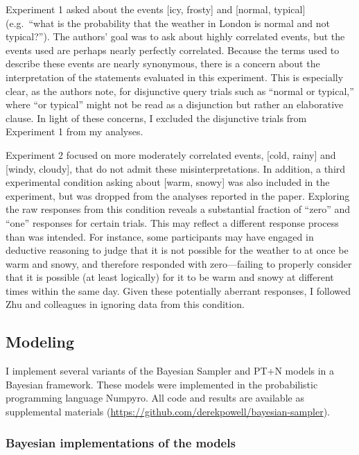 \documentclass[
  english,
  man,floatsintext]{apa6}
\begin{document}
Experiment 1 asked about the events {[}icy, frosty{]} and {[}normal, typical{]} (e.g.~``what is the probability that the weather in London is normal and not typical?''). The authors' goal was to ask about highly correlated events, but the events used are perhaps nearly perfectly correlated. Because the terms used to describe these events are nearly synonymous, there is a concern about the interpretation of the statements evaluated in this experiment. This is especially clear, as the authors note, for disjunctive query trials such as ``normal or typical,'' where ``or typical'' might not be read as a disjunction but rather an elaborative clause. In light of these concerns, I excluded the disjunctive trials from Experiment 1 from my analyses.

Experiment 2 focused on more moderately correlated events, {[}cold, rainy{]} and {[}windy, cloudy{]}, that do not admit these misinterpretations. In addition, a third experimental condition asking about {[}warm, snowy{]} was also included in the experiment, but was dropped from the analyses reported in the paper. Exploring the raw responses from this condition reveals a substantial fraction of ``zero'' and ``one'' responses for certain trials. This may reflect a different response process than was intended. For instance, some participants may have engaged in deductive reasoning to judge that it is not possible for the weather to at once be warm and snowy, and therefore responded with zero---failing to properly consider that it is possible (at least logically) for it to be warm and snowy at different times within the same day. Given these potentially aberrant responses, I followed Zhu and colleagues \autocite*{zhu.etal2020} in ignoring data from this condition.

\hypertarget{modeling}{%
\subsection{Modeling}\label{modeling}}

I implement several variants of the Bayesian Sampler and PT+N models in a Bayesian framework. These models were implemented in the probabilistic programming language Numpyro. All code and results are available as supplemental materials (\url{https://github.com/derekpowell/bayesian-sampler}).

\hypertarget{bayesian-implementations-of-the-models}{%
\subsubsection{Bayesian implementations of the models}\label{bayesian-implementations-of-the-models}}
\end{document}
